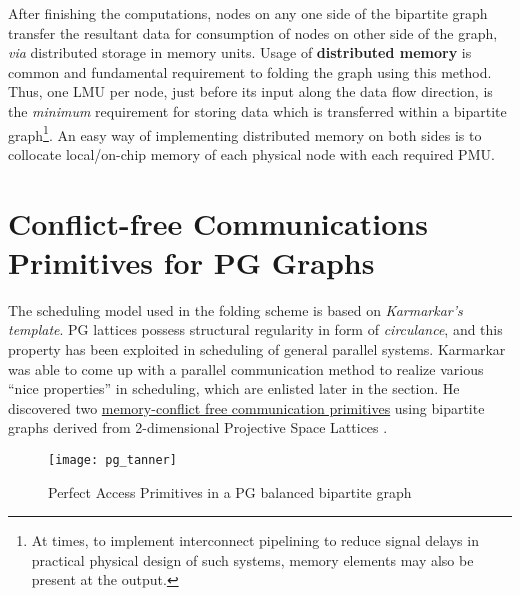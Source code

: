 \documentclass[12pt]{article}
\begin{document}
After finishing the computations, nodes on any one side of the bipartite
graph transfer the resultant data for consumption of nodes on other side of
the graph, \textit{via} distributed storage in memory units. Usage of
\textbf{distributed memory} is common and fundamental requirement to folding the
graph using this method. Thus, one LMU per
node, just before its input along the data flow direction, is
the \textit{minimum} requirement for storing data which is
transferred within a bipartite graph\footnote{At times, to implement interconnect
pipelining to reduce signal delays in practical physical design of such
systems, memory elements may also be present at the output.}.
An easy way of implementing distributed memory on both sides is to collocate
local/on-chip memory of each physical node with each required PMU.

\section{Conflict-free Communications Primitives for PG Graphs}
\label{karm_sec}
The scheduling model used in the folding scheme is based on
\textit{Karmarkar's template}\cite{karm1}. PG lattices possess structural
regularity in form of \textit{circulance}, and this property has been
exploited in scheduling of general parallel systems. Karmarkar was able to
come up with a parallel communication method to realize various ``nice
properties'' in scheduling, which are enlisted later in the section. He
discovered two \uline{memory-conflict free communication primitives} using
bipartite graphs derived from 2-dimensional Projective Space Lattices
\cite{karm1}.

\begin{figure}[!h]
\centering
\texttt{[image: pg\_tanner]}
\caption{Perfect Access Primitives in a PG balanced bipartite graph}
\label{pg_tan}
\end{figure}
\end{document}
